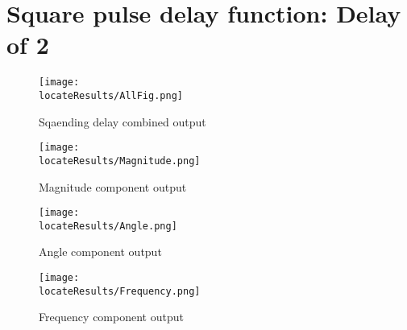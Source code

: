 \newpage
\section{Square pulse  delay function: Delay of 2}

\begin{figure}[hb]
    \texttt{[image: \\locateResults/AllFig.png]}    
    \caption{Sqaending delay combined output}
    \label{fig:PMUsim-Sqa2-allfig}
\end{figure}


     \begin{figure}
 
    \texttt{[image: \\locateResults/Magnitude.png]}    
         \label{fig:PMUsim-Sqa2Mag}
        \caption{Magnitude component output}
 
\end{figure}

     \begin{figure}
 
   \texttt{[image: \\locateResults/Angle.png]}    
         \label{fig:PMUsim-Sqa2Ang}
        \caption{Angle component output}
 
\end{figure}

     \begin{figure}
 
   \texttt{[image: \\locateResults/Frequency.png]}    
         \label{fig:PMUsim-Sqa2Freq}
        \caption{Frequency component output}
 
\end{figure}


